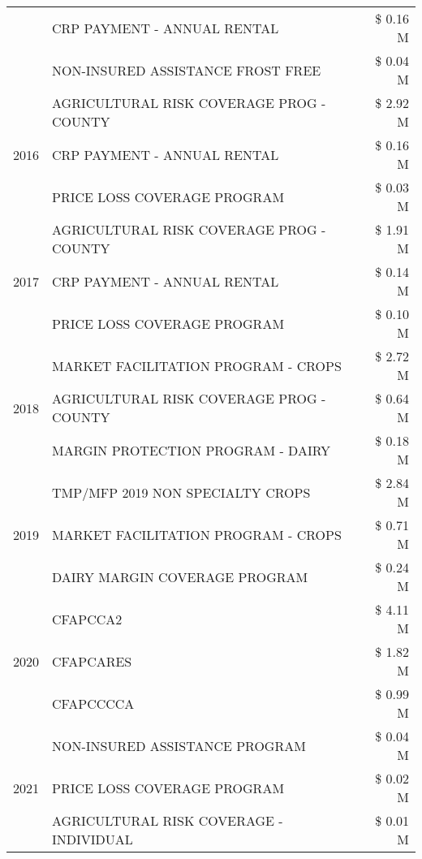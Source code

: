 \begin{tabular}{llr}
 & CRP PAYMENT - ANNUAL RENTAL & \$ 0.16 M \\
 & NON-INSURED ASSISTANCE FROST FREE & \$ 0.04 M \\
\cline{1-3}
\multirow[t]{3}{*}{2016} & AGRICULTURAL RISK COVERAGE PROG - COUNTY & \$ 2.92 M \\
 & CRP PAYMENT - ANNUAL RENTAL & \$ 0.16 M \\
 & PRICE LOSS COVERAGE PROGRAM & \$ 0.03 M \\
\cline{1-3}
\multirow[t]{3}{*}{2017} & AGRICULTURAL RISK COVERAGE PROG - COUNTY & \$ 1.91 M \\
 & CRP PAYMENT - ANNUAL RENTAL & \$ 0.14 M \\
 & PRICE LOSS COVERAGE PROGRAM & \$ 0.10 M \\
\cline{1-3}
\multirow[t]{3}{*}{2018} & MARKET FACILITATION PROGRAM - CROPS & \$ 2.72 M \\
 & AGRICULTURAL RISK COVERAGE PROG - COUNTY & \$ 0.64 M \\
 & MARGIN PROTECTION PROGRAM - DAIRY & \$ 0.18 M \\
\cline{1-3}
\multirow[t]{3}{*}{2019} & TMP/MFP 2019 NON SPECIALTY CROPS & \$ 2.84 M \\
 & MARKET FACILITATION PROGRAM - CROPS & \$ 0.71 M \\
 & DAIRY MARGIN COVERAGE PROGRAM & \$ 0.24 M \\
\cline{1-3}
\multirow[t]{3}{*}{2020} & CFAPCCA2 & \$ 4.11 M \\
 & CFAPCARES & \$ 1.82 M \\
 & CFAPCCCCA & \$ 0.99 M \\
\cline{1-3}
\multirow[t]{3}{*}{2021} & NON-INSURED ASSISTANCE PROGRAM & \$ 0.04 M \\
 & PRICE LOSS COVERAGE PROGRAM & \$ 0.02 M \\
 & AGRICULTURAL RISK COVERAGE - INDIVIDUAL & \$ 0.01 M \\
\cline{1-3}
\bottomrule
\end{tabular}
